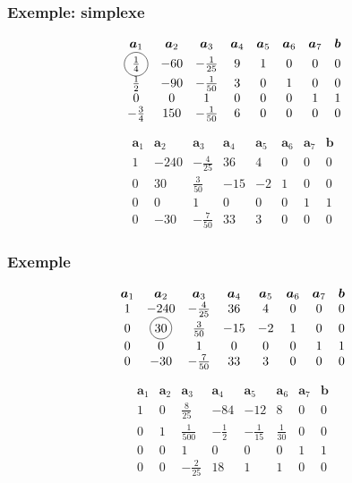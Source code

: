 \documentclass[t,usepdftitle=false]{beamer}
\newcommand*\circled[1]{\tikz[baseline=(char.base)]{
    \node[shape=circle,draw,inner sep=2pt] (char) {#1};}}
\def\ba{\boldsymbol{a}}
\def\bb{\boldsymbol{b}}
\begin{document}
\begin{frame}
	\frametitle{Exemple: simplexe}
	
	\[
	\begin{matrix}
		\ba_1 & \ba_2 & \ba_3 & \ba_4 & \ba_5 &\ba_6 &\ba_7 & \bb \\
		\circled{$\frac{1}{4}$} & -60 & -\frac{1}{25} & 9 & 1 & 0 & 0 & 0 \\
		\frac{1}{2} & -90 & -\frac{1}{50} & 3 & 0 & 1 & 0 & 0 \\
		0 & 0 & 1 & 0 & 0 & 0 & 1 & 1 \\
		-\frac{3}{4} & 150 & -\frac{1}{50} & 6 & 0 & 0 & 0 & 0
	\end{matrix}
	\]
	
	\[
	\begin{matrix}
		\ba_1 & \ba_2 & \ba_3 & \ba_4 & \ba_5 &\ba_6 &\ba_7 & \bb \\
		1 & -240 & -\frac{4}{25} & 36 & 4 & 0 & 0 & 0 \\
		0 & 30 & \frac{3}{50} & -15 & -2 & 1 & 0 & 0 \\
		0 & 0 & 1 & 0 & 0 & 0 & 1 & 1 \\
		0 & -30 & -\frac{7}{50} & 33 & 3 & 0 & 0 & 0
	\end{matrix}
	\]
	
\end{frame}

\begin{frame}
	\frametitle{Exemple}
	
	\[
	\begin{matrix}
		\ba_1 & \ba_2 & \ba_3 & \ba_4 & \ba_5 &\ba_6 &\ba_7 & \bb \\
		1 & -240 & -\frac{4}{25} & 36 & 4 & 0 & 0 & 0 \\
		0 & \circled{30} & \frac{3}{50} & -15 & -2 & 1 & 0 & 0 \\
		0 & 0 & 1 & 0 & 0 & 0 & 1 & 1 \\
		0 & -30 & -\frac{7}{50} & 33 & 3 & 0 & 0 & 0
	\end{matrix}
	\]
	
	\[
	\begin{matrix}
		\ba_1 & \ba_2 & \ba_3 & \ba_4 & \ba_5 &\ba_6 &\ba_7 & \bb \\
		1 & 0 & \frac{8}{25} & -84 & -12 & 8 & 0 & 0 \\
		0 & 1 & \frac{1}{500} & -\frac{1}{2} & -\frac{1}{15} & \frac{1}{30} & 0 & 0 \\
		0 & 0 & 1 & 0 & 0 & 0 & 1 & 1 \\
		0 & 0 & -\frac{2}{25} & 18 & 1 & 1 & 0 & 0
	\end{matrix}
	\]
	
\end{frame}
\end{document}
